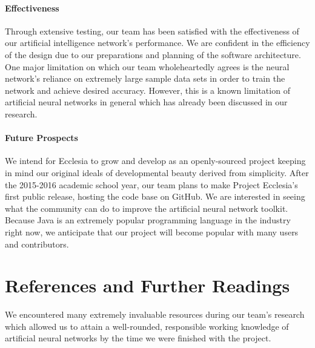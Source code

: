 \documentclass[letterpaper, 10pt]{article}
\begin{document}
	\paragraph{Effectiveness}
	Through extensive testing, our team has been satisfied with the effectiveness of our artificial intelligence network's performance. We are confident in the efficiency of the design due to our preparations and planning of the software architecture. One major limitation on which our team wholeheartedly agrees is the neural network's reliance on extremely large sample data sets in order to train the network and achieve desired accuracy. However, this is a known limitation of artificial neural networks in general which has already been discussed in our research.
	
	\paragraph{Future Prospects}
	We intend for Ecclesia to grow and develop as an openly-sourced project keeping in mind our original ideals of developmental beauty derived from simplicity. After the 2015-2016 academic school year, our team plans to make Project Ecclesia's first public release, hosting the code base on GitHub. We are interested in seeing what the community can do to improve the artificial neural network toolkit. Because Java is an extremely popular programming language in the industry right now, we anticipate that our project will become popular with many users and contributors.


\cleardoublepage
\section{References and Further Readings}
	We encountered many extremely invaluable resources during our team's research which allowed us to attain a well-rounded, responsible working knowledge of artificial neural networks by the time we were finished with the project.

	\large
	\vspace{0.65cm}
\end{document}
